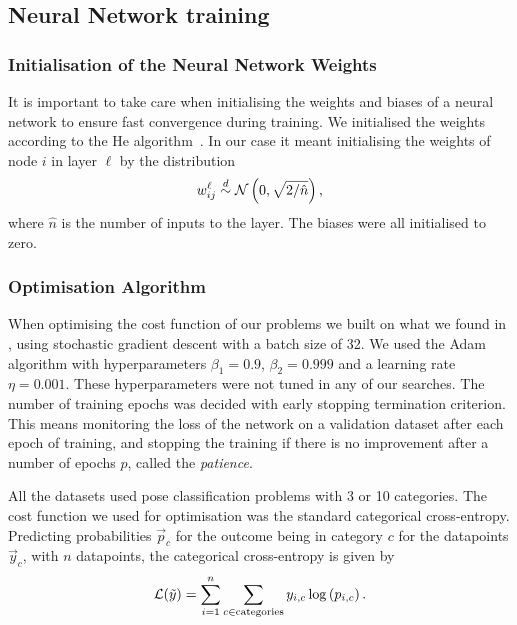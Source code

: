 \subsection{Neural Network training}

    \subsubsection{Initialisation of the Neural Network Weights}
        It is important to take care when initialising the weights and biases of a neural network to ensure fast convergence during training. We initialised the weights according to the He algorithm~\citep{He}. In our case it meant initialising the weights of node $i$ in layer $\ell$ by the distribution
        \begin{align}
            w^\ell_{ij} \overset{d}{\sim} \operatorname{\mathcal{N}}\left(0,\sqrt{2/\hat{n}}\right),
        \end{align}
        where $\hat{n}$ is the number of inputs to the layer. The biases were all initialised to zero.

    \subsubsection{Optimisation Algorithm}
        When optimising the cost function of our problems we built on what we found in \citep{Project2}, using stochastic gradient descent with a batch size of 32. We used the Adam algorithm with hyperparameters $\beta_1 = 0.9$, $\beta_2 = 0.999$ and a learning rate $\eta = 0.001$. These hyperparameters were not tuned in any of our searches. The number of training epochs was decided with early stopping termination criterion. This means monitoring the loss of the network on a validation dataset after each epoch of training, and stopping the training if there is no improvement after a number of epochs $p$, called the \textit{patience}.

        All the datasets used pose classification problems with 3 or 10 categories. The cost function we used for optimisation was the standard categorical cross-entropy. Predicting probabilities $\vec{p}_c$ for the outcome being in category $c$ for the datapoints $\vec{y}_c$, with $n$ datapoints, the categorical cross-entropy is given by
        \begin{align}
            \mathcal{L}(\tilde{y}) = \sum_{i=1}^n \sum_{c \in \mathrm{categories}} y_{i,c} \log\left(p_{i,c}\right).
        \end{align}

